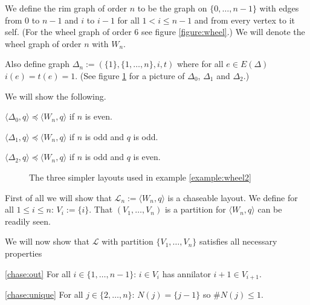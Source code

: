 \begin{example}\label{example:wheel2}
	We define the rim graph of order $n$ to be the graph on
	$\{0,\ldots,n-1\}$ with edges from $0$ to $n-1$ and $i$ to $i-1$ for all
	$1<i\le n-1$ and from every vertex to it self. (For the wheel graph of
	order 6 see figure \ref{figure:wheel}.) We will denote the wheel graph
	of order $n$ with $W_{n}$.
	
	Also define graph $\Delta_n := (\{1\},\{1,\ldots,n\},i,t)$ where for all
	$e\in E(\Delta)$ $i(e)=t(e)=1$. (See figure
	\ref{figure:simplerwheel} for a picture of $\Delta_{0}$,
	$\Delta_{1}$ and $\Delta_{2}$.)
		
	We will show the following.
	\begin{namedlist}
		\item[$\langle\Delta_0,q\rangle \preceq \langle W_n,q\rangle$] if $n$ is even.
		\item[$\langle\Delta_1,q\rangle \preceq \langle W_n,q\rangle$] if $n$ is odd and
		$q$ is odd.
		\item[$\langle\Delta_2,q\rangle \preceq \langle W_n,q\rangle$] if $n$ is odd and
		$q$ is even.
	\end{namedlist}
	\begin{figure}
		\begin{center}
			\hspace*{\fill}
			\hfill
			\hfill
			\hspace*{\fill}
		\end{center}
		\caption{The three simpler layouts used in example
		\ref{example:wheel2}}\label{figure:simplerwheel} 
	\end{figure}
	
	First of all we will show that $\mathcal{L}_{n} := \langle W_{n},q\rangle$
	is a chaseable layout. We define for all $1\le i\le n$: $V_{i} :=
	\{i\}$. That $(V_{1},\ldots,V_{n})$ is a partition for $\langle
	W_{n},q\rangle$ can be readily seen.
	
	We will now show that $\mathcal{L}$ with partition
	$\{V_{1},\ldots,V_{n}\}$ satisfies all necessary properties
	\begin{namedlist}
		\item[\ref{chase:out}] For all $i\in\{1,\ldots,n-1\}$: $i\in
		V_{i}$ has annilator $i+1\in V_{i+1}$.
		
		\item[\ref{chase:unique}] For all $j\in\{2,\ldots,n\}$:
		$N(j) = \{j-1\}$ so $\#N(j)\le 1$.


\end{namedlist}
\end{example}
